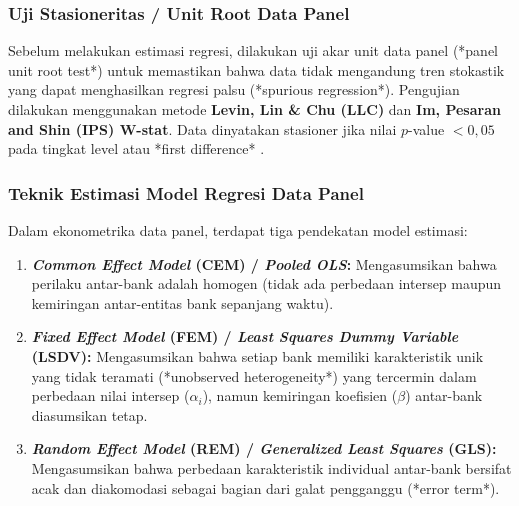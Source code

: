 \documentclass[12pt,a4paper]{article}
\numberwithin{equation}{section}
\begin{document}
\subsubsection{Uji Stasioneritas / Unit Root Data Panel}
\noindent
Sebelum melakukan estimasi regresi, dilakukan uji akar unit data panel (*panel unit root test*) untuk memastikan bahwa data tidak mengandung tren stokastik yang dapat menghasilkan regresi palsu (*spurious regression*). Pengujian dilakukan menggunakan metode \textbf{Levin, Lin \& Chu (LLC)} dan \textbf{Im, Pesaran and Shin (IPS) W-stat}. Data dinyatakan stasioner jika nilai $p$-value $< 0{,}05$ pada tingkat level atau *first difference* \citep{GujaratiPorter2020}.

\subsubsection{Teknik Estimasi Model Regresi Data Panel}
\noindent
Dalam ekonometrika data panel, terdapat tiga pendekatan model estimasi:
\begin{enumerate}
  \item \textbf{\emph{Common Effect Model} (CEM) / \emph{Pooled OLS}:} Mengasumsikan bahwa perilaku antar-bank adalah homogen (tidak ada perbedaan intersep maupun kemiringan antar-entitas bank sepanjang waktu).
  \item \textbf{\emph{Fixed Effect Model} (FEM) / \emph{Least Squares Dummy Variable} (LSDV):} Mengasumsikan bahwa setiap bank memiliki karakteristik unik yang tidak teramati (*unobserved heterogeneity*) yang tercermin dalam perbedaan nilai intersep ($\alpha_i$), namun kemiringan koefisien ($\beta$) antar-bank diasumsikan tetap.
  \item \textbf{\emph{Random Effect Model} (REM) / \emph{Generalized Least Squares} (GLS):} Mengasumsikan bahwa perbedaan karakteristik individual antar-bank bersifat acak dan diakomodasi sebagai bagian dari galat pengganggu (*error term*).
\end{enumerate}
\end{document}
